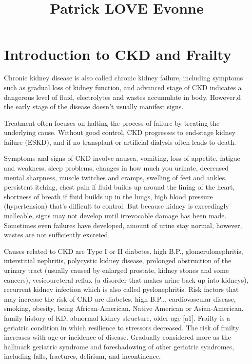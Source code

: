 \documentclass[jou]{apa6}
\title{Patrick LOVE Evonne}
\begin{document}
\maketitle

\section{Introduction to CKD and Frailty}
Chronic kidney disease is also called chronic kidney failure, including symptoms such as gradual loss of kidney function, and advanced stage of CKD indicates a dangerous level of fluid, electrolytes and wastes accumulate in body. However,d the early stage of the disease doesn’t usually manifest signs.

Treatment often focuses on halting the process of failure by treating the underlying cause. Without good control, CKD progresses to end-stage kidney failure (ESKD), and if no transplant or artificial dialysis often leads to death.

Symptoms and signs of CKD involve nausea, vomiting, loss of appetite, fatigue and weakness, sleep problems, changes in how much you urinate, decreased mental sharpness, muscle twitches and cramps, swelling of feet and ankles, persistent itching, chest pain if fluid builds up around the lining of the heart, shortness of breath if fluid builds up in the lungs, high blood pressure (hypertension) that’s difficult to control. But because kidney is exceedingly malleable, signs may not develop until irrevocable damage has been made. Sometimes even failures have developed, amount of urine stay normal, however, wastes are not sufficiently excreted.

Causes related to CKD are Type I or II diabetes, high B.P., glomerulonephritis, interstitial nephritis, polycystic kidney disease, prolonged obstruction of the urinary tract (usually caused by enlarged prostate, kidney stones and some cancers), vesicoureteral reflux (a disorder that makes urine back up into kidneys), recurrent kidney infection which is also called pyelonephritis. Risk factors that may increase the risk of CKD are diabetes, high B.P.., cardiovascular disease, smoking, obesity, being African-American, Native American or Asian-American, family history of KD, abnormal kidney structure, older age [a1].
Frailty is a geriatric condition in which resilience to stressors decreased. The risk of frailty increases with age or incidence of disease. Gradually considered more as the hallmark geriatric syndrome and foreshadowing of other geriatric syndromes, including falls, fractures, delirium, and incontinence. 
\end{document}
